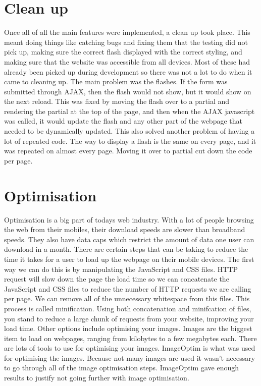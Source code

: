 \section{Clean up}
Once all of all the main features were implemented, a clean up took place. This meant doing things like catching bugs and fixing them that the testing did not pick up, making sure the correct flash displayed with the correct styling, and making sure that the website was accessible from all devices. Most of these had already been picked up during development so there was not a lot to do when it came to cleaning up. The main problem was the flashes. If the form was submitted through AJAX, then the flash would not show, but it would show on the next reload. This was fixed by moving the flash over to a partial and rendering the partial at the top of the page, and then when the AJAX javascript was called, it would update the flash and any other part of the webpage that needed to be dynamically updated. This also solved another problem of having a lot of repeated code. The way to display a flash is the same on every page, and it was repeated on almost every page. Moving it over to partial cut down the code per page.\\

\section{Optimisation}
Optimisation is a big part of todays web industry. With a lot of people browsing the web from their mobiles, their download speeds are slower than broadband speeds. They also have data caps which restrict the amount of data one user can download in a month. There are certain steps that can be taking to reduce the time it takes for a user to load up the webpage on their mobile devices. The first way we can do this is by manipulating the JavaScript and CSS files. HTTP request will slow down the page the load time so we can concatenate the JavaScript and CSS files to reduce the number of HTTP requests we are calling per page. We can remove all of the unnecessary whitespace from this files. This process is called minification. Using both concatenation and minifcation of files, you stand to reduce a large chunk of requests from your website, improving your load time. Other options include optimising your images. Images are the biggest item to load on webpages, ranging from kilobytes to a few megabytes each. There are lots of tools to use for optimising your images. ImageOptim \citep{imageoptim:2014} is what was used for optimising the images. Because not many images are used it wasn't necessary to go through all of the image optimisation steps. ImageOptim gave enough results to justify not going further with image optimisation.\\


